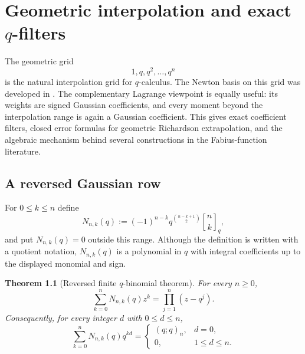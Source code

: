 \documentclass[11pt,oneside,openany]{book}
\newtheorem{theorem}{Theorem}[chapter]
\theoremstyle{definition}
\theoremstyle{remark}
\newcommand{\qbinom}[2]{\genfrac{[}{]}{0pt}{}{#1}{#2}_{q}}
\begin{document}
\chapter{Geometric interpolation and exact \texorpdfstring{$q$}{q}-filters}\label{chap:geometric-filters}

The geometric grid
\[
  1,q,q^2,\ldots,q^n
\]
is the natural interpolation grid for $q$-calculus.  The Newton basis on this grid was developed in .  The complementary Lagrange viewpoint is equally useful: its weights are signed Gaussian coefficients, and every moment beyond the interpolation range is again a Gaussian coefficient.  This gives exact coefficient filters, closed error formulas for geometric Richardson extrapolation, and the algebraic mechanism behind several constructions in the Fabius-function literature.

\section{A reversed Gaussian row}

For $0\le k\le n$ define
\begin{equation}\label{eq:reversed-gaussian-row}
 N_{n,k}(q)
 :=(-1)^{n-k}q^{\binom{n-k+1}{2}}\qbinom nk,
\end{equation}
and put $N_{n,k}(q)=0$ outside this range.  Although the definition is written with a quotient notation, $N_{n,k}(q)$ is a polynomial in $q$ with integral coefficients up to the displayed monomial and sign.

\begin{theorem}[Reversed finite $q$-binomial theorem]\label{thm:reversed-qbinomial}
For every $n\ge0$,
\begin{equation}\label{eq:reversed-product}
 \sum_{k=0}^{n}N_{n,k}(q)z^k
 =\prod_{j=1}^{n}(z-q^j).
\end{equation}
Consequently, for every integer $d$ with $0\le d\le n$,
\begin{equation}\label{eq:reversed-moments}
 \sum_{k=0}^{n}N_{n,k}(q)q^{kd}
 =
 \begin{cases}
   (q;q)_n,&d=0,\\
   0,&1\le d\le n.
 \end{cases}
\end{equation}
\end{theorem}
\end{document}
